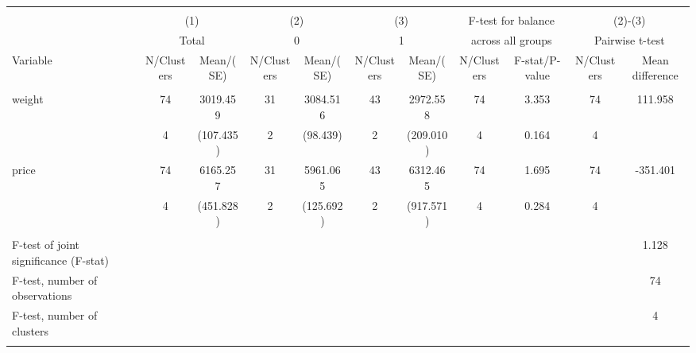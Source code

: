 
\begin{tabular}{@{\extracolsep{5pt}}lcccccccccc}
\\[-1.8ex]\hline \hline \\[-1.8ex]
 & \multicolumn{2}{c}{(1)}  & \multicolumn{2}{c}{(2)}  & \multicolumn{2}{c}{(3)}  & \multicolumn{2}{c}{F-test for balance} & \multicolumn{2}{c}{(2)-(3)} \\
 & \multicolumn{2}{c}{Total}  & \multicolumn{2}{c}{0}  & \multicolumn{2}{c}{1}  & \multicolumn{2}{c}{across all groups} & \multicolumn{2}{c}{Pairwise t-test}  \\
Variable & N/Clusters & Mean/(SE) & N/Clusters & Mean/(SE) & N/Clusters & Mean/(SE) & N/Clusters & F-stat/P-value & N/Clusters & Mean difference \\ \hline \\[-1.8ex] 
weight   & 74    & 3019.459    & 31    & 3084.516    & 43    & 2972.558    & 74    & 3.353    & 74    & 111.958   \\
 & 4  & (107.435)  & 2  & (98.439)  & 2  & (209.010)  & 4  & 0.164  & 4  &  \\ [1ex]
price   & 74    & 6165.257    & 31    & 5961.065    & 43    & 6312.465    & 74    & 1.695    & 74    & -351.401   \\
 & 4  & (451.828)  & 2  & (125.692)  & 2  & (917.571)  & 4  & 0.284  & 4  &  \\ [1ex]
\hline \\[-1.8ex]
F-test of joint significance (F-stat) & &   & &   & &   & &     & &  1.128  \\
F-test, number of observations & &   & &   & &   & &   & &  74  \\
F-test, number of clusters & &   & &   & &   & &     & &  4  \\
\hline \hline \\[-1.8ex]

\end{tabular}

